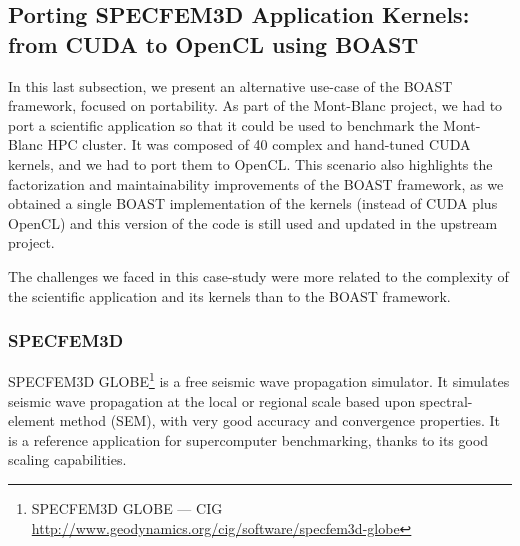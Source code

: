\documentclass{IEEEtran}
\begin{document}
% 
% 
% 
% 
 

\subsection{Porting SPECFEM3D Application Kernels: from CUDA to OpenCL
using BOAST\label{subsec:specfem}}

In this last subsection, we present an alternative use-case of the BOAST
framework, focused on portability. As part of the Mont-Blanc project,
we had to port a scientific application so that it could be used to
benchmark the Mont-Blanc HPC cluster. It was composed of 40 complex
and hand-tuned CUDA kernels, and we had to port them to OpenCL. This
scenario also highlights the factorization and maintainability
improvements of the BOAST framework, as we obtained a single BOAST
implementation of the kernels (instead of CUDA plus OpenCL) and this
version of the code is still used and updated in the upstream project.

The challenges we faced in this case-study were more related to the
complexity of the scientific application and its kernels than to the
BOAST framework.
\subsubsection{SPECFEM3D}

SPECFEM3D GLOBE\footnote{SPECFEM3D GLOBE --- CIG
  \url{http://www.geodynamics.org/cig/software/specfem3d-globe}} is a
free seismic wave propagation simulator. It simulates seismic wave
propagation at the local or regional scale based upon spectral-element
method (SEM), with very good accuracy and convergence properties. It
is a reference application for supercomputer benchmarking, thanks to
its good scaling capabilities.
\end{document}
